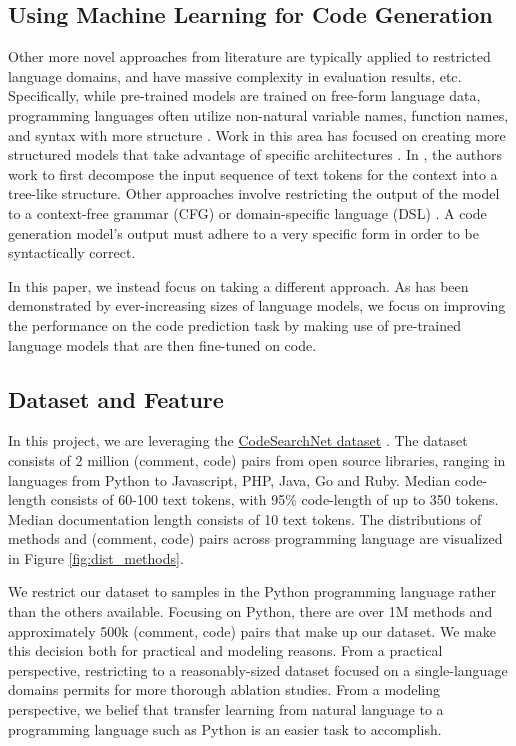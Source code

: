 \documentclass[10pt,twocolumn]{article}
\begin{document}
\subsection{Using Machine Learning for Code Generation}
Other more novel approaches from literature \cite{structural_code_modeling} are typically applied to restricted language domains, and have massive complexity in evaluation results, etc. Specifically, while pre-trained models are trained on free-form language data, programming languages often utilize non-natural variable names, function names, and syntax with more structure \cite{structural_code_modeling}. Work in this area has focused on creating more structured models that take advantage of specific architectures \cite{treegen}. In \cite{treegan}, the authors work to first decompose the input sequence of text tokens for the context into a tree-like structure. Other approaches involve restricting the output of the model to a context-free grammar (CFG) or domain-specific language (DSL) \cite{grammar_based}. A code generation model’s output must adhere to a very specific form in order to be syntactically correct.

In this paper, we instead focus on taking a different approach. As has been demonstrated by ever-increasing sizes of language models, we focus on improving the performance on the code prediction task by making use of pre-trained language models that are then fine-tuned on code. 

\subsection{Dataset and Feature}
In this project, we are leveraging the \href{https://github.com/github/CodeSearchNet}{CodeSearchNet dataset} \cite{codesearchnet}. The dataset consists of 2 million (comment, code) pairs from open source libraries, ranging in languages from Python to Javascript, PHP, Java, Go and Ruby. Median code-length consists of 60-100 text tokens, with 95\% code-length of up to 350 tokens. Median documentation length consists of 10 text tokens. The distributions of methods and (comment, code) pairs across programming language are visualized in Figure \ref{fig:dist_methods}.

We restrict our dataset to samples in the Python programming language rather than the others available. Focusing on Python, there are over 1M methods and approximately 500k (comment, code) pairs that make up our dataset. We make this decision both for practical and modeling reasons. From a practical perspective, restricting to a reasonably-sized dataset focused on a single-language domains permits for more thorough ablation studies. From a modeling perspective, we belief that transfer learning from natural language to a programming language such as Python is an easier task to accomplish.
\end{document}
